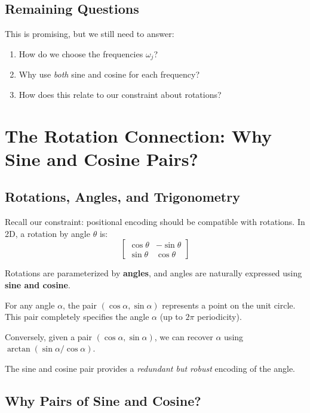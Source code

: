 \documentclass{article}
\begin{document}
\subsection{Remaining Questions}

This is promising, but we still need to answer:
\begin{enumerate}
\item How do we choose the frequencies $\omega_j$?
\item Why use \emph{both} sine and cosine for each frequency?
\item How does this relate to our constraint about rotations?
\end{enumerate}

\section{The Rotation Connection: Why Sine and Cosine Pairs?}

\subsection{Rotations, Angles, and Trigonometry}

Recall our constraint: positional encoding should be compatible with rotations. In 2D, a rotation by angle $\theta$ is:
\[
\begin{bmatrix}
\cos\theta & -\sin\theta \\
\sin\theta & \cos\theta
\end{bmatrix}
\]

Rotations are parameterized by \textbf{angles}, and angles are naturally expressed using \textbf{sine and cosine}.

\begin{tcolorbox}[colback=blue!5!white, colframe=blue!50!black, title=The Trigonometric Identity]
For any angle $\alpha$, the pair $(\cos\alpha, \sin\alpha)$ represents a point on the unit circle. This pair completely specifies the angle $\alpha$ (up to $2\pi$ periodicity).

Conversely, given a pair $(\cos\alpha, \sin\alpha)$, we can recover $\alpha$ using $\arctan(\sin\alpha / \cos\alpha)$.

The sine and cosine pair provides a \emph{redundant but robust} encoding of the angle.
\end{tcolorbox}

\subsection{Why Pairs of Sine and Cosine?}
\end{document}
